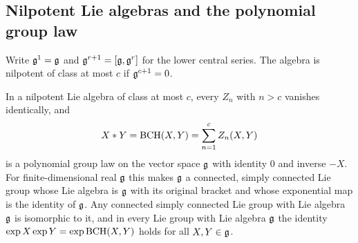 \subsection{Nilpotent Lie algebras and the polynomial group law}\label{sec:nilpotent}
Write $\mathfrak{g}^1=\mathfrak{g}$ and $\mathfrak{g}^{r+1}=[\mathfrak{g},\mathfrak{g}^r]$ for the lower central series. The
algebra is nilpotent of class at most $c$ if $\mathfrak{g}^{c+1}=0$.
\begin{theorem}\label{thm:nilpotent}
In a nilpotent Lie algebra of class at most $c$, every $Z_n$ with $n>c$
vanishes identically, and
\begin{equation}\label{eq:nilpotentlaw}
 X*Y=\operatorname{BCH}(X,Y)=\sum_{n=1}^{c}Z_n(X,Y)
\end{equation}
is a polynomial group law on the vector space $\mathfrak{g}$ with identity $0$ and
inverse $-X$. For finite-dimensional real $\mathfrak{g}$ this makes $\mathfrak{g}$ a connected,
simply connected Lie group whose Lie algebra is $\mathfrak{g}$ with its original
bracket and whose exponential map is the identity of $\mathfrak{g}$. Any connected
simply connected Lie group with Lie algebra $\mathfrak{g}$ is isomorphic to it, and
in every Lie group with Lie algebra $\mathfrak{g}$ the identity
$\exp X\exp Y=\exp\operatorname{BCH}(X,Y)$ holds for all $X,Y\in\mathfrak{g}$.
\end{theorem}
